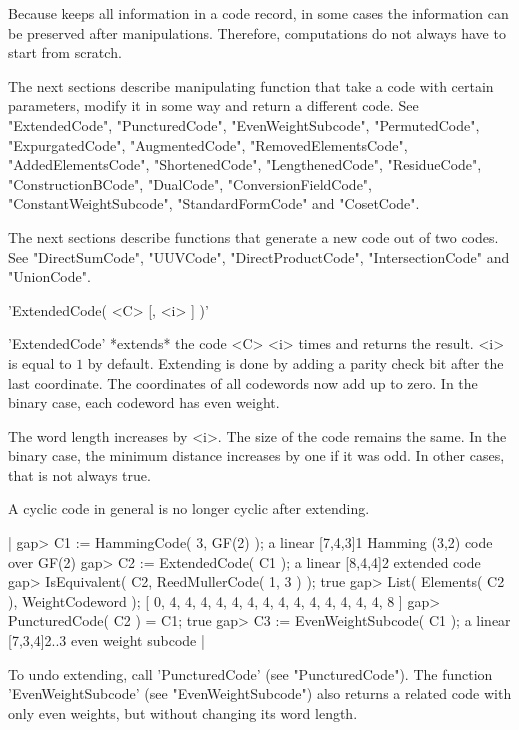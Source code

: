 Because {\GUAVA}  keeps all information  in a code  record, in some cases
the   information can  be   preserved   after manipulations.   Therefore,
computations do not always have to start from scratch.

The next sections  describe manipulating function that  take a code  with
certain   parameters, modify  it   in some  way  and   return a different
code.   See   "ExtendedCode",    "PuncturedCode",    "EvenWeightSubcode",
"PermutedCode", "ExpurgatedCode", "AugmentedCode", "RemovedElementsCode",
"AddedElementsCode",  "ShortenedCode",   "LengthenedCode", "ResidueCode",
"ConstructionBCode",         "DualCode",           "ConversionFieldCode",
"ConstantWeightSubcode", "StandardFormCode" and "CosetCode".

The next sections describe functions that generate a  new code out of two
codes.     See    "DirectSumCode",   "UUVCode",      "DirectProductCode",
"IntersectionCode" and "UnionCode".


'ExtendedCode( <C> [, <i> ] )'

'ExtendedCode'  *extends* the    code <C>   <i> times   and  returns  the
result. <i> is  equal to $1$ by default.  Extending is  done by adding  a
parity check bit  after  the  last coordinate.  The coordinates   of  all
codewords now add up to zero. In the binary case,  each codeword has even
weight.

The word  length increases  by  <i>. The   size of the  code remains  the
same. In the binary case, the minimum distance increases by one if it was
odd. In other cases, that is not always true.

A cyclic code in general is no longer cyclic after extending.

|    gap> C1 := HammingCode( 3, GF(2) );
    a linear [7,4,3]1 Hamming (3,2) code over GF(2)
    gap> C2 := ExtendedCode( C1 );
    a linear [8,4,4]2 extended code
    gap> IsEquivalent( C2, ReedMullerCode( 1, 3 ) );
    true
    gap> List( Elements( C2 ), WeightCodeword );
    [ 0, 4, 4, 4, 4, 4, 4, 4, 4, 4, 4, 4, 4, 4, 4, 8 ]
    gap> PuncturedCode( C2 ) = C1;
    true
    gap> C3 := EvenWeightSubcode( C1 );
    a linear [7,3,4]2..3 even weight subcode |

To  undo  extending,  call   'PuncturedCode' (see  "PuncturedCode").  The
function 'EvenWeightSubcode' (see  "EvenWeightSubcode")  also  returns  a
related  code with   only even  weights, but  without   changing its word
length.

